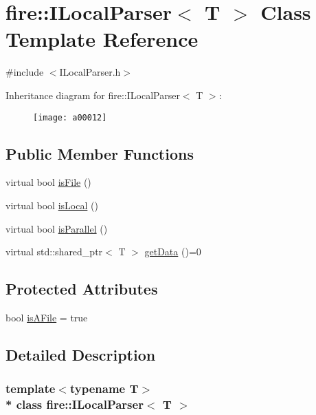 \hypertarget{a00012}{}\section{fire\+:\+:I\+Local\+Parser$<$ T $>$ Class Template Reference}
\label{a00012}


{\ttfamily \#include $<$I\+Local\+Parser.\+h$>$}

Inheritance diagram for fire\+:\+:I\+Local\+Parser$<$ T $>$\+:\begin{figure}[H]
\begin{center}
\leavevmode
\texttt{[image: a00012]}
\end{center}
\end{figure}
\subsection*{Public Member Functions}
\begin{DoxyCompactItemize}
\item 
virtual bool \hyperlink{a00012_a091d5cf56bf8f407854ef87f460b2958}{is\+File} ()
\item 
virtual bool \hyperlink{a00012_a770acae6e216de3a9c7140a12de25d58}{is\+Local} ()
\item 
virtual bool \hyperlink{a00012_ad46898c516adcce38acbb4800dc9777b}{is\+Parallel} ()
\item 
virtual std\+::shared\+\_\+ptr$<$ T $>$ \hyperlink{a00012_a0fc1446d106f0ab8daf8744a4bd29a65}{get\+Data} ()=0
\end{DoxyCompactItemize}
\subsection*{Protected Attributes}
\begin{DoxyCompactItemize}
\item 
bool \hyperlink{a00012_a39adf288ae0bc79cf39fd6e4638858cf}{is\+A\+File} = true
\end{DoxyCompactItemize}


\subsection{Detailed Description}
\subsubsection*{template$<$typename T$>$\\*
class fire\+::\+I\+Local\+Parser$<$ T $>$}

